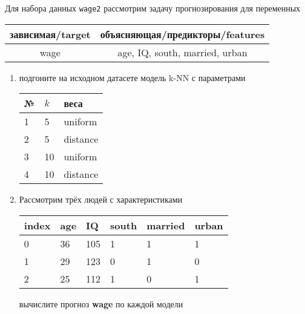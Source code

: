 \begin{exercise}
Для набора данных \texttt{wage2} рассмотрим задачу прогнозирования
для переменных
\begin{center}
	\begin{tabular}{|c|c|}\hline
		зависимая/target & объясняющая/предикторы/features \\ \hline
		wage & age, IQ, south, married, urban \\ \hline
	\end{tabular}
\end{center}
\begin{enumerate}
	\item подгоните на исходном датасете модель k-NN с параметрами
	\begin{center}
		\begin{tabular}{|l|l|l|}\hline
		№ & \(k\) & веса \\ \hline
		1 & 5 & uniform \\
		2 & 5 & distance \\
		3 & 10 & uniform \\
		4 & 10 & distance \\ \hline
		\end{tabular}
	\end{center}
	\item Рассмотрим трёх людей с характеристиками
	\begin{center}
		\begin{tabular}{|l||l|l|l|l|l|}\hline
			index & age & IQ & south & married & urban \\ \hline\hline
			0 & 36 & 105 & 1 & 1 & 1 \\
			1 & 29 & 123 & 0 & 1 & 0 \\
			2 & 25 & 112 & 1 & 0 & 1 \\ \hline
		\end{tabular}
	\end{center}
	вычислите прогноз \textbf{wage} по каждой модели
\end{enumerate}
\end{exercise}

